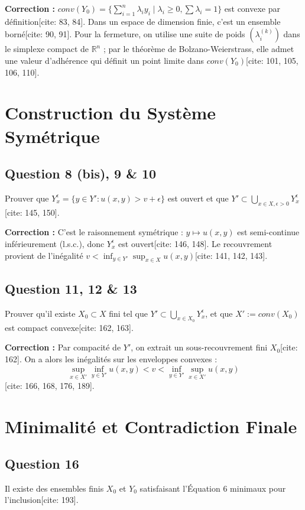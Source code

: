 \textbf{Correction :}
$conv(Y_0) = \{ \sum_{i=1}^n \lambda_i y_i \mid \lambda_i \ge 0, \sum \lambda_i = 1 \}$ est convexe par définition[cite: 83, 84]. Dans un espace de dimension finie, c'est un ensemble borné[cite: 90, 91]. Pour la fermeture, on utilise une suite de poids $(\lambda_i^{(k)})$ dans le simplexe compact de $\mathbb{R}^n$ ; par le théorème de Bolzano-Weierstrass, elle admet une valeur d'adhérence qui définit un point limite dans $conv(Y_0)$[cite: 101, 105, 106, 110].

\section*{Construction du Système Symétrique}

\subsection*{Question 8 (bis), 9 \& 10}
Prouver que $Y_x^\epsilon = \{y \in Y' : u(x, y) > v + \epsilon\}$ est ouvert et que $Y' \subset \bigcup_{x \in X, \epsilon > 0} Y_x^\epsilon$[cite: 145, 150].

\textbf{Correction :}
C'est le raisonnement symétrique : $y \mapsto u(x, y)$ est semi-continue inférieurement (l.s.c.), donc $Y_x^\epsilon$ est ouvert[cite: 146, 148]. Le recouvrement provient de l'inégalité $v < \inf_{y \in Y'} \sup_{x \in X} u(x, y)$[cite: 141, 142, 143].

\subsection*{Question 11, 12 \& 13}
Prouver qu'il existe $X_0 \subset X$ fini tel que $Y' \subset \bigcup_{x \in X_0} Y_x^\epsilon$, et que $X' := conv(X_0)$ est compact convexe[cite: 162, 163].

\textbf{Correction :}
Par compacité de $Y'$, on extrait un sous-recouvrement fini $X_0$[cite: 162]. On a alors les inégalités sur les enveloppes convexes :
\[ \sup_{x \in X'} \inf_{y \in Y'} u(x, y) < v < \inf_{y \in Y'} \sup_{x \in X'} u(x, y) \][cite: 166, 168, 176, 189].

\section*{Minimalité et Contradiction Finale}

\subsection*{Question 16}
Il existe des ensembles finis $X_0$ et $Y_0$ satisfaisant l'Équation 6 minimaux pour l'inclusion[cite: 193].

